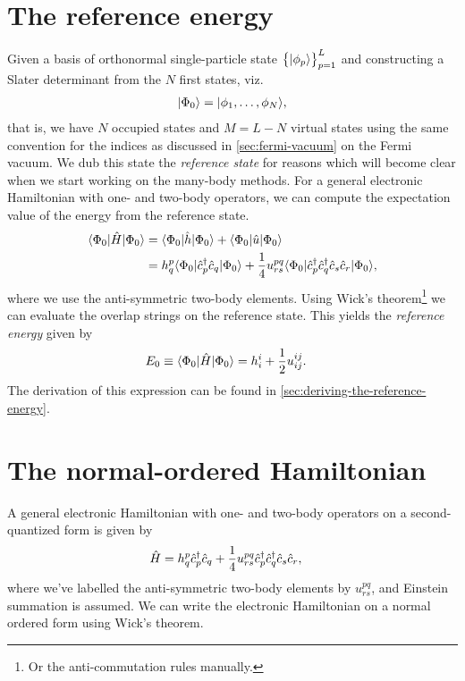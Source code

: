     \section{The reference energy}
        Given a basis of orthonormal single-particle state
        $\left\{ | \phi_p \rangle \right\}_{p = 1}^{L}$ and constructing a Slater determinant
        from the $N$ first states, viz.
        \begin{align}
            | \Phi_{0} \rangle = | \phi_1, \dots, \phi_N \rangle,
        \end{align}
        that is, we have $N$ occupied states and $M = L - N$ virtual states
        using the same convention for the indices as discussed in
        \autoref{sec:fermi-vacuum} on the Fermi vacuum.
        We dub this state the \emph{reference state} for reasons which will
        become clear when we start working on the many-body methods.
        For a general electronic Hamiltonian with one- and two-body operators,
        we can compute the expectation value of the energy from the reference
        state.
        \begin{align}
            \langle \Phi_{0} |\hat{H}| \Phi_{0} \rangle
            &=
            \langle \Phi_{0} |\hat{h}| \Phi_{0} \rangle
            + \langle \Phi_{0} |\hat{u}| \Phi_{0} \rangle
            \\
            &=
            h^{p}_{q}
            \langle \Phi_{0} |\hat{c}_{p}^{\dagger}\hat{c}_{q}| \Phi_{0} \rangle
            + \frac{1}{4}
            u^{pq}_{rs}
            \langle \Phi_{0} |\hat{c}_{p}^{\dagger}\hat{c}_{q}^{\dagger}\hat{c}_{s}\hat{c}_{r}| \Phi_{0} \rangle,
        \end{align}
        where we use the anti-symmetric two-body elements.
        Using Wick's theorem\footnote{%
            Or the anti-commutation rules manually.
        }%
        we can evaluate the overlap strings on the reference state.
        This yields the \emph{reference energy} given by
        \begin{align}
            E_{0}
            &\equiv
            \langle \Phi_{0} |\hat{H}| \Phi_{0} \rangle
            =
            h^{i}_{i}
            + \frac{1}{2}u^{ij}_{ij}.
            \label{eq:reference-energy}
        \end{align}
        The derivation of this expression can be found in
        \autoref{sec:deriving-the-reference-energy}.

    \section{The normal-ordered Hamiltonian}
        A general electronic Hamiltonian with one- and two-body operators on
        a second-quantized form is given by
        \begin{align}
            \hat{H}
            &= h^{p}_{q}\hat{c}_{p}^{\dagger}\hat{c}_{q}
            + \frac{1}{4}u^{pq}_{rs}\hat{c}_{p}^{\dagger}\hat{c}_{q}^{\dagger}\hat{c}_{s}\hat{c}_{r},
        \end{align}
        where we've labelled the anti-symmetric two-body elements by
        $u^{pq}_{rs}$, and Einstein summation is assumed.
        We can write the electronic Hamiltonian on a normal ordered form using
        Wick's theorem.



